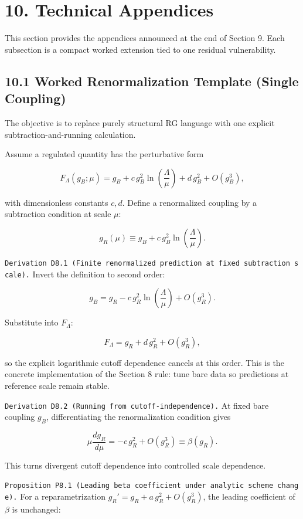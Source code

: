 \documentclass[
]{article}
\begin{document}
\section{10. Technical Appendices}\label{technical-appendices}

This section provides the appendices announced at the end of Section 9.
Each subsection is a compact worked extension tied to one residual
vulnerability.

\subsection{10.1 Worked Renormalization Template (Single
Coupling)}\label{worked-renormalization-template-single-coupling}

The objective is to replace purely structural RG language with one
explicit subtraction-and-running calculation.

Assume a regulated quantity has the perturbative form

\[
F_\Lambda(g_B;\mu)
=
g_B
+c\,g_B^2\ln\!\left(\frac{\Lambda}{\mu}\right)
+d\,g_B^2
+O(g_B^3),
\]

with dimensionless constants \(c,d\). Define a renormalized coupling by
a subtraction condition at scale \(\mu\):

\[
g_R(\mu)\equiv g_B+c\,g_B^2\ln\!\left(\frac{\Lambda}{\mu}\right).
\]

\texttt{Derivation\ D8.1\ (Finite\ renormalized\ prediction\ at\ fixed\ subtraction\ scale).}
Invert the definition to second order:

\[
g_B
=
g_R-c\,g_R^2\ln\!\left(\frac{\Lambda}{\mu}\right)+O(g_R^3).
\]

Substitute into \(F_\Lambda\):

\[
F_\Lambda
=
g_R
+d\,g_R^2
+O(g_R^3),
\]

so the explicit logarithmic cutoff dependence cancels at this order.
This is the concrete implementation of the Section 8 rule: tune bare
data so predictions at reference scale remain stable.

\texttt{Derivation\ D8.2\ (Running\ from\ cutoff-independence).} At
fixed bare coupling \(g_B\), differentiating the renormalization
condition gives

\[
\mu\frac{d g_R}{d\mu}
=
-c\,g_R^2+O(g_R^3)
\equiv
\beta(g_R).
\]

This turns divergent cutoff dependence into controlled scale dependence.

\texttt{Proposition\ P8.1\ (Leading\ beta\ coefficient\ under\ analytic\ scheme\ change).}
For a reparametrization \(g_R' = g_R + a\,g_R^2 + O(g_R^3)\), the
leading coefficient of \(\beta\) is unchanged:
\end{document}
